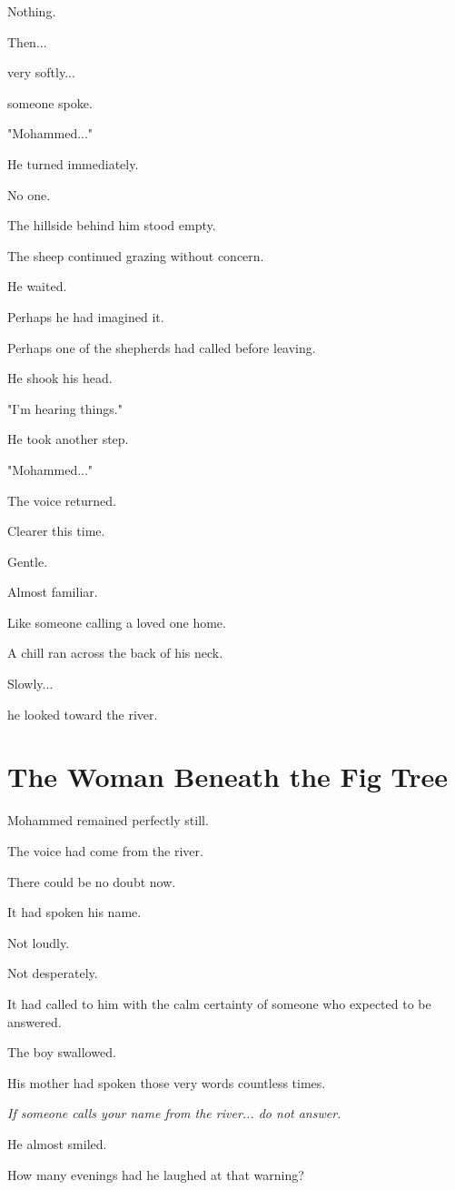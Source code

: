 \documentclass[12pt,openany]{book}
\begin{document}
Nothing.

Then...

very softly...

someone spoke.

"Mohammed..."

He turned immediately.

No one.

The hillside behind him stood empty.

The sheep continued grazing without concern.

He waited.

Perhaps he had imagined it.

Perhaps one of the shepherds had called before leaving.

He shook his head.

"I'm hearing things."

He took another step.

"Mohammed..."

The voice returned.

Clearer this time.

Gentle.

Almost familiar.

Like someone calling a loved one home.

A chill ran across the back of his neck.

Slowly...

he looked toward the river.
\section*{The Woman Beneath the Fig Tree}

Mohammed remained perfectly still.

The voice had come from the river.

There could be no doubt now.

It had spoken his name.

Not loudly.

Not desperately.

It had called to him with the calm certainty of someone who expected to be answered.

The boy swallowed.

His mother had spoken those very words countless times.

\emph{If someone calls your name from the river... do not answer.}

He almost smiled.

How many evenings had he laughed at that warning?
\end{document}
